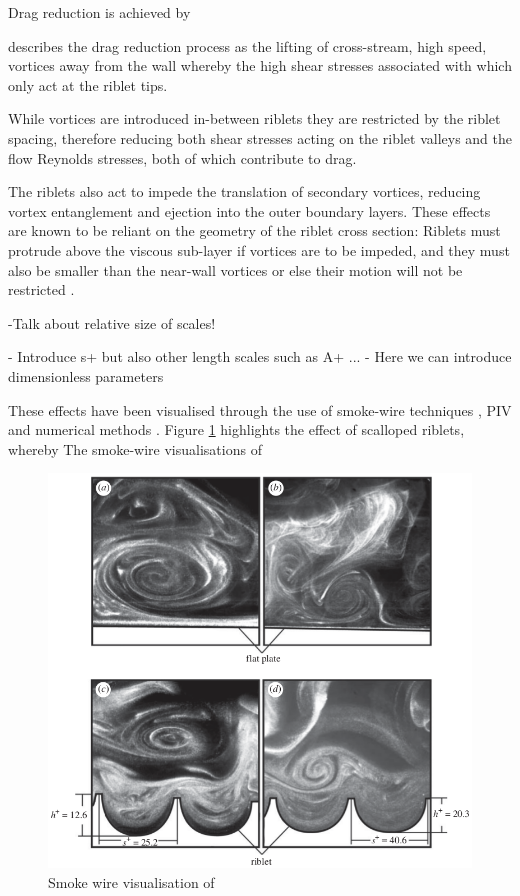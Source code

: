\documentclass[12pt,oneside,a4paper]{article}
\begin{document}
 \newpage
 

Drag reduction is achieved by 

\cite{dean2010} describes the drag reduction process as the lifting of cross-stream, high speed, vortices away from the wall whereby the high shear stresses associated with which only act at the riblet tips.


While vortices are introduced in-between riblets they are restricted by the riblet spacing, therefore reducing both shear stresses acting on the riblet valleys and the flow Reynolds stresses, both of which contribute to drag.

The riblets also act to impede the translation of secondary vortices, reducing vortex entanglement and ejection into the outer boundary layers. These effects are known to be reliant on the geometry of the riblet cross section: Riblets must protrude above the viscous sub-layer if vortices are to be impeded, and they must also be smaller than the near-wall vortices or else their motion will not be restricted \citep{dean2010}. 
 
 -Talk about relative size of scales! 
 
 - Introduce s+ but also other length scales such as A+ ...
 - Here we can introduce dimensionless parameters
 
 
 
  These effects have been visualised through the use of smoke-wire techniques \citep{lee2001}, PIV \citep{lee2008} and numerical methods \citep{goldstein1995}. Figure \ref{figure:literatureReview:smokeWireVisualisation} highlights the effect of scalloped riblets, whereby 
  The smoke-wire visualisations of \cite{lee2001} 
  
\begin{figure}[!t]
\centering
\includegraphics[width=12cm]{images/smokeWireVisualisation.png}
\caption{Smoke wire visualisation of \cite{lee2001}}
\label{figure:literatureReview:smokeWireVisualisation}
\end{figure}
 
\end{document}
